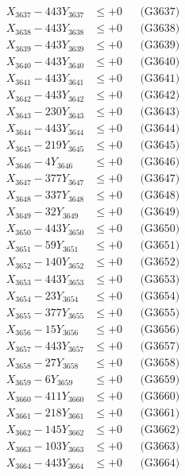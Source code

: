 \documentclass[a4paper,10pt]{article}
\begin{document}
{\begin{align}
X_{3637} - 443Y_{3637} &\leq +0 && \text{(G3637)} \\
X_{3638} - 443Y_{3638} &\leq +0 && \text{(G3638)} \\
X_{3639} - 443Y_{3639} &\leq +0 && \text{(G3639)} \\
X_{3640} - 443Y_{3640} &\leq +0 && \text{(G3640)} \\
\allowbreak
X_{3641} - 443Y_{3641} &\leq +0 && \text{(G3641)} \\
X_{3642} - 443Y_{3642} &\leq +0 && \text{(G3642)} \\
X_{3643} - 230Y_{3643} &\leq +0 && \text{(G3643)} \\
X_{3644} - 443Y_{3644} &\leq +0 && \text{(G3644)} \\
X_{3645} - 219Y_{3645} &\leq +0 && \text{(G3645)} \\
X_{3646} - 4Y_{3646} &\leq +0 && \text{(G3646)} \\
X_{3647} - 377Y_{3647} &\leq +0 && \text{(G3647)} \\
X_{3648} - 337Y_{3648} &\leq +0 && \text{(G3648)} \\
X_{3649} - 32Y_{3649} &\leq +0 && \text{(G3649)} \\
X_{3650} - 443Y_{3650} &\leq +0 && \text{(G3650)} \\
\allowbreak
X_{3651} - 59Y_{3651} &\leq +0 && \text{(G3651)} \\
X_{3652} - 140Y_{3652} &\leq +0 && \text{(G3652)} \\
X_{3653} - 443Y_{3653} &\leq +0 && \text{(G3653)} \\
X_{3654} - 23Y_{3654} &\leq +0 && \text{(G3654)} \\
X_{3655} - 377Y_{3655} &\leq +0 && \text{(G3655)} \\
X_{3656} - 15Y_{3656} &\leq +0 && \text{(G3656)} \\
X_{3657} - 443Y_{3657} &\leq +0 && \text{(G3657)} \\
X_{3658} - 27Y_{3658} &\leq +0 && \text{(G3658)} \\
X_{3659} - 6Y_{3659} &\leq +0 && \text{(G3659)} \\
X_{3660} - 411Y_{3660} &\leq +0 && \text{(G3660)} \\
\allowbreak
X_{3661} - 218Y_{3661} &\leq +0 && \text{(G3661)} \\
X_{3662} - 145Y_{3662} &\leq +0 && \text{(G3662)} \\
X_{3663} - 103Y_{3663} &\leq +0 && \text{(G3663)} \\
X_{3664} - 443Y_{3664} &\leq +0 && \text{(G3664)} \\

\end{align}}
\end{document}
